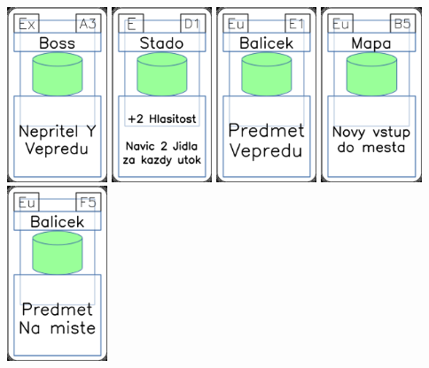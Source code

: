 \documentclass[a4paper]{article}
\begin{document}
	\includegraphics[width=3.0cm]{img-4_2}
	\includegraphics[width=3.0cm]{img-4_45}
	\includegraphics[width=3.0cm]{img-4_20}
	\includegraphics[width=3.0cm]{img-4_39}
	\includegraphics[width=3.0cm]{img-4_29}
\end{document}
